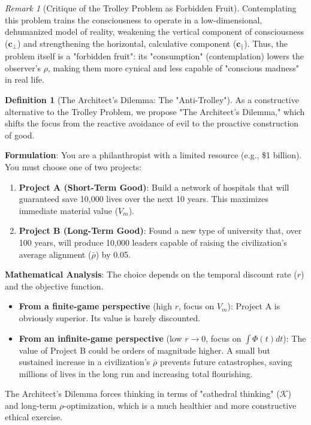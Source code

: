 \documentclass[11pt,a4paper]{article}
\theoremstyle{definition}
\newtheorem{definition}{Definition}[section]
\theoremstyle{remark}
\newtheorem{remark}{Remark}[section]
\newcommand{\cc}{\mathbf{c}}
\begin{document}
\begin{small}
\begin{enumerate}
\begin{mdframed}[backgroundcolor=green!10,linewidth=2pt,linecolor=green!70!black]
\begin{remark}[Critique of the Trolley Problem as Forbidden Fruit]
Contemplating this problem trains the consciousness to operate in a low-dimensional, dehumanized model of reality, weakening the vertical component of consciousness ($\cc_\perp$) and strengthening the horizontal, calculative component ($\cc_\parallel$). Thus, the problem itself is a "forbidden fruit": its "consumption" (contemplation) lowers the observer's $\rho$, making them more cynical and less capable of "conscious madness" in real life.
\end{remark}

\begin{definition}[The Architect's Dilemma: The "Anti-Trolley"]
As a constructive alternative to the Trolley Problem, we propose "The Architect's Dilemma," which shifts the focus from the reactive avoidance of evil to the proactive construction of good.

\textbf{Formulation}: You are a philanthropist with a limited resource (e.g., \$1 billion). You must choose one of two projects:
\begin{enumerate}
    \item \textbf{Project A (Short-Term Good)}: Build a network of hospitals that will guaranteed save 10,000 lives over the next 10 years. This maximizes immediate material value ($V_m$).
    \item \textbf{Project B (Long-Term Good)}: Found a new type of university that, over 100 years, will produce 10,000 leaders capable of raising the civilization's average alignment ($\bar{\rho}$) by 0.05.
\end{enumerate}

\textbf{Mathematical Analysis}: The choice depends on the temporal discount rate ($r$) and the objective function.
\begin{itemize}
    \item \textbf{From a finite-game perspective} (high $r$, focus on $V_m$): Project A is obviously superior. Its value is barely discounted.
    \item \textbf{From an infinite-game perspective} (low $r \to 0$, focus on $\int \Phi(t) dt$): The value of Project B could be orders of magnitude higher. A small but sustained increase in a civilization's $\bar{\rho}$ prevents future catastrophes, saving millions of lives in the long run and increasing total flourishing.
\end{itemize}
The Architect's Dilemma forces thinking in terms of "cathedral thinking" ($\mathcal{K}$) and long-term $\rho$-optimization, which is a much healthier and more constructive ethical exercise.
\end{definition}


\end{mdframed}
\end{enumerate}
\end{small}
\end{document}
